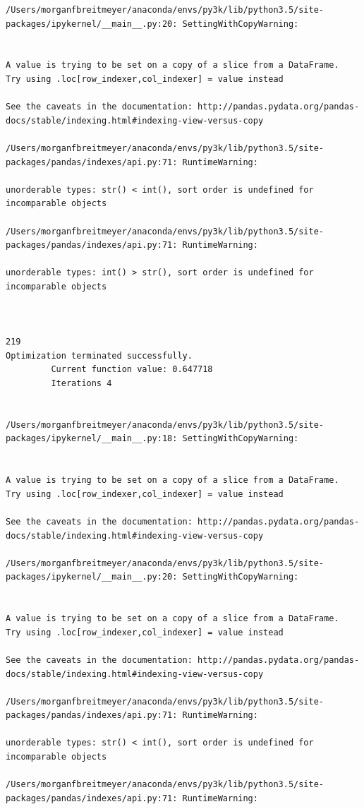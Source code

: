 \begin{lstlisting}
/Users/morganfbreitmeyer/anaconda/envs/py3k/lib/python3.5/site-packages/ipykernel/__main__.py:20: SettingWithCopyWarning:


A value is trying to be set on a copy of a slice from a DataFrame.
Try using .loc[row_indexer,col_indexer] = value instead

See the caveats in the documentation: http://pandas.pydata.org/pandas-docs/stable/indexing.html#indexing-view-versus-copy

/Users/morganfbreitmeyer/anaconda/envs/py3k/lib/python3.5/site-packages/pandas/indexes/api.py:71: RuntimeWarning:

unorderable types: str() < int(), sort order is undefined for incomparable objects

/Users/morganfbreitmeyer/anaconda/envs/py3k/lib/python3.5/site-packages/pandas/indexes/api.py:71: RuntimeWarning:

unorderable types: int() > str(), sort order is undefined for incomparable objects



219
Optimization terminated successfully.
         Current function value: 0.647718
         Iterations 4


/Users/morganfbreitmeyer/anaconda/envs/py3k/lib/python3.5/site-packages/ipykernel/__main__.py:18: SettingWithCopyWarning:


A value is trying to be set on a copy of a slice from a DataFrame.
Try using .loc[row_indexer,col_indexer] = value instead

See the caveats in the documentation: http://pandas.pydata.org/pandas-docs/stable/indexing.html#indexing-view-versus-copy

/Users/morganfbreitmeyer/anaconda/envs/py3k/lib/python3.5/site-packages/ipykernel/__main__.py:20: SettingWithCopyWarning:


A value is trying to be set on a copy of a slice from a DataFrame.
Try using .loc[row_indexer,col_indexer] = value instead

See the caveats in the documentation: http://pandas.pydata.org/pandas-docs/stable/indexing.html#indexing-view-versus-copy

/Users/morganfbreitmeyer/anaconda/envs/py3k/lib/python3.5/site-packages/pandas/indexes/api.py:71: RuntimeWarning:

unorderable types: str() < int(), sort order is undefined for incomparable objects

/Users/morganfbreitmeyer/anaconda/envs/py3k/lib/python3.5/site-packages/pandas/indexes/api.py:71: RuntimeWarning:


\end{lstlisting}
